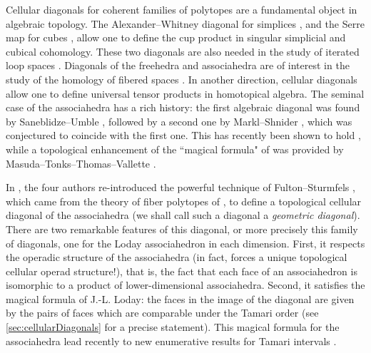 \documentclass{amsart}
\newcommand{\darkblue}{\color{darkblue}} %
\theoremstyle{definition}
\newcommand{\defn}[1]{\textsl{\darkblue #1}} %
\begin{document}


Cellular diagonals for coherent families of polytopes are a fundamental object in algebraic topology. 
The Alexander--Whitney diagonal for simplices \cite{EilenbergMacLane}, and the Serre map for cubes \cite{Serre}, allow one to define the cup product in singular simplicial and cubical cohomology. 
These two diagonals are also needed in the study of iterated loop spaces \cite{Baues}.
Diagonals of the freehedra and associahedra are of interest in the study of the homology of fibered spaces \cite{Saneblidze-freeLoopFibration,SaneblidzeRivera, Proute}. 
In another direction, cellular diagonals allow one to define universal tensor products in homotopical algebra. 
The seminal case of the associahedra has a rich history: the first algebraic diagonal was found by Saneblidze--Umble \cite{SaneblidzeUmble}, followed by a second one by Markl--Shnider \cite{MarklShnider}, which was conjectured to coincide with the first one. 
This has recently been shown to hold \cite{SaneblidzeUmble-comparingDiagonals}, while a topological enhancement of the ``magical formula" of \cite{MarklShnider} was provided by Masuda--Tonks--Thomas--Vallette \cite{MasudaThomasTonksVallette}.

In \cite{MasudaThomasTonksVallette}, the four authors re-introduced the powerful technique of Fulton--Sturmfels \cite{FultonSturmfels}, which came from the theory of fiber polytopes of \cite{BilleraSturmfels}, to define a topological cellular diagonal of the associahedra (we shall call such a diagonal a \defn{geometric diagonal}).
There are two remarkable features of this diagonal, or more precisely this family of diagonals, one for the Loday associahedron in each dimension.
First, it respects the operadic structure of the associahedra (in fact, forces a unique topological cellular operad structure!), that is, the fact that each face of an associahedron is isomorphic to a product of lower-dimensional associahedra.
Second, it satisfies the magical formula of J.-L. Loday: the faces in the image of the diagonal are given by the pairs of faces which are comparable under the Tamari order (see \cref{sec:cellularDiagonals} for a precise statement). 
This magical formula for the associahedra lead recently to new enumerative results for Tamari intervals \cite{BostanChyzakPilaud}.
\end{document}
